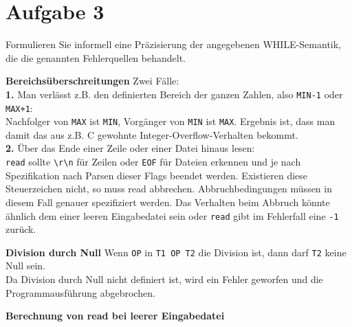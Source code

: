 \documentclass[ngerman,a4paper]{report}
\begin{document}
\section*{Aufgabe 3}
Formulieren Sie informell eine Präzisierung der angegebenen WHILE-Semantik, die die genannten Fehlerquellen behandelt.\\
\begin{compactenum}
\item [\textbf{Bereichsüberschreitungen}] Zwei Fälle: \\\textbf{1.} Man verlässt z.B. den definierten Bereich der ganzen Zahlen, also \lstinline!MIN-1! oder \lstinline!MAX+1!:\\
	Nachfolger von \lstinline!MAX! ist \lstinline!MIN!, Vorgänger von \lstinline!MIN! ist \lstinline!MAX!. Ergebnis ist, dass man damit das aus z.B. C gewohnte Integer-Overflow-Verhalten bekommt.
	\\ \textbf{2.} Über das Ende einer Zeile oder einer Datei hinaus lesen:\\ \lstinline!read! sollte \lstinline!\r\n! für Zeilen oder \lstinline!EOF! für Dateien erkennen und je nach Spezifikation nach Parsen dieser Flags beendet werden. Existieren diese Steuerzeichen nicht, so muss read abbrechen. Abbruchbedingungen müssen in diesem Fall genauer spezifiziert werden. Das Verhalten beim Abbruch könnte ähnlich dem einer leeren Eingabedatei sein oder \lstinline!read! gibt im Fehlerfall eine \lstinline!-1! zurück.\\	
\item [\textbf{Division durch Null}] Wenn \lstinline!OP! in \lstinline!T1 OP T2! die Division ist, dann darf \lstinline!T2! keine Null sein.\\
	Da Division durch Null nicht definiert ist, wird ein Fehler geworfen und die Programmausführung abgebrochen.\\
\item [\textbf{Berechnung von read bei leerer Eingabedatei}] %

\end{compactenum}
\end{document}
